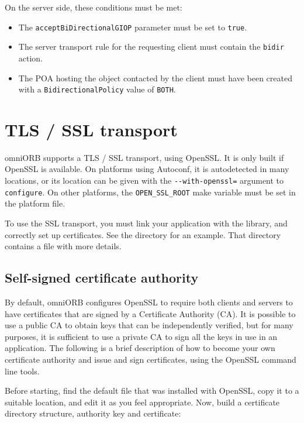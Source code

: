\documentclass[11pt,oneside,a4paper]{book}
\newcommand{\code}[1]{\texttt{#1}}
\begin{document}
\noindent On the server side, these conditions must be met:

\begin{itemize}

\item The \code{acceptBiDirectionalGIOP} parameter must be set to \code{true}. 
\item The server transport rule for the requesting client must contain
      the \code{bidir} action.
\item The POA hosting the object contacted by the client must have
      been created with a \code{BidirectionalPolicy} value of
      \code{BOTH}.

\end{itemize}


\section{TLS / SSL transport}

omniORB supports a TLS / SSL transport, using OpenSSL. It is only
built if OpenSSL is available. On platforms using Autoconf, it is
autodetected in many locations, or its location can be given with the
\code{-{}-with-openssl=} argument to \code{configure}. On other
platforms, the \code{OPEN\_SSL\_ROOT} make variable must be set in the
platform file.

To use the SSL transport, you must link your application with the
 library, and correctly set up certificates. See the
 directory for an example. That directory
contains a  file with more details.

\subsection{Self-signed certificate authority}

By default, omniORB configures OpenSSL to require both clients and
servers to have certificates that are signed by a Certificate
Authority (CA). It is possible to use a public CA to obtain keys that
can be independently verified, but for many purposes, it is sufficient
to use a private CA to sign all the keys in use in an application. The
following is a brief description of how to become your own certificate
authority and issue and sign certificates, using the OpenSSL command
line tools.

Before starting, find the default  file that was
installed with OpenSSL, copy it to a suitable location, and edit it as
you feel appropriate. Now, build a certificate directory structure,
authority key and certificate:
\end{document}
